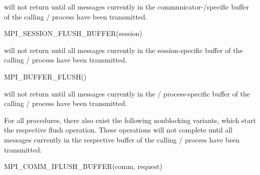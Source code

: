  will not return until all messages currently in the communicator\hyphen/specific buffer of the calling \MPI/ process have been transmitted.

\begin{funcdef}{MPI\_SESSION\_FLUSH\_BUFFER}{(\mbox{session})}
\end{funcdef}

 will not return until all messages currently in the session-specific buffer of the calling \MPI/ process have been transmitted.

\begin{funcdefna}{MPI\_BUFFER\_FLUSH}{()}
\end{funcdefna}

 will not return until all messages currently in the \MPI/ process-specific buffer of the calling \MPI/ process have been transmitted.


For all  procedures, there also exist the following nonblocking variants, which start the respective flush operation. These operations will not complete until all messages currently in the respective  buffer of the calling \MPI/ process have been transmitted.

\begin{funcdef}{MPI\_COMM\_IFLUSH\_BUFFER}{(\mbox{comm}, \mbox{request})}
\end{funcdef}

